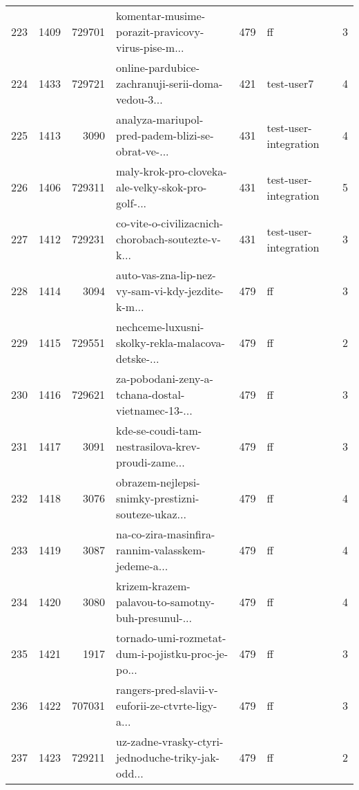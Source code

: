 \begin{tabular}{lrrlrlr}
223  &       1409 &   729701 &  komentar-musime-porazit-pravicovy-virus-pise-m... &      479 &                           ff &               3 \\
224  &       1433 &   729721 &  online-pardubice-zachranuji-serii-doma-vedou-3... &      421 &                   test-user7 &               4 \\
225  &       1413 &     3090 &  analyza-mariupol-pred-padem-blizi-se-obrat-ve-... &      431 &        test-user-integration &               4 \\
226  &       1406 &   729311 &  maly-krok-pro-cloveka-ale-velky-skok-pro-golf-... &      431 &        test-user-integration &               5 \\
227  &       1412 &   729231 &  co-vite-o-civilizacnich-chorobach-soutezte-v-k... &      431 &        test-user-integration &               3 \\
228  &       1414 &     3094 &  auto-vas-zna-lip-nez-vy-sam-vi-kdy-jezdite-k-m... &      479 &                           ff &               3 \\
229  &       1415 &   729551 &  nechceme-luxusni-skolky-rekla-malacova-detske-... &      479 &                           ff &               2 \\
230  &       1416 &   729621 &  za-pobodani-zeny-a-tchana-dostal-vietnamec-13-... &      479 &                           ff &               3 \\
231  &       1417 &     3091 &  kde-se-coudi-tam-nestrasilova-krev-proudi-zame... &      479 &                           ff &               3 \\
232  &       1418 &     3076 &  obrazem-nejlepsi-snimky-prestizni-souteze-ukaz... &      479 &                           ff &               4 \\
233  &       1419 &     3087 &  na-co-zira-masinfira-rannim-valasskem-jedeme-a... &      479 &                           ff &               4 \\
234  &       1420 &     3080 &  krizem-krazem-palavou-to-samotny-buh-presunul-... &      479 &                           ff &               4 \\
235  &       1421 &     1917 &  tornado-umi-rozmetat-dum-i-pojistku-proc-je-po... &      479 &                           ff &               3 \\
236  &       1422 &   707031 &  rangers-pred-slavii-v-euforii-ze-ctvrte-ligy-a... &      479 &                           ff &               3 \\
237  &       1423 &   729211 &  uz-zadne-vrasky-ctyri-jednoduche-triky-jak-odd... &      479 &                           ff &               2 \\

\end{tabular}
